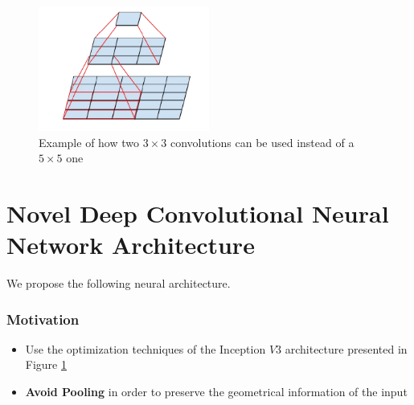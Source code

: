 \documentclass[a0, portrait]{IWIposter}
\begin{document}
\begin{multicols}{3}
\begin{itemize}
\end{itemize}

\begin{figure}[H]
	\centering
	\includegraphics[width=0.5\textwidth]{ConvolutionsExample.png}
	\caption{Example of how two $3 \times 3$ convolutions can be used instead of a $5 \times 5$ one}
	\label{fig:ConvolutionsExample}
\end{figure}



\section*{Novel Deep Convolutional Neural Network Architecture}

We propose the following neural architecture.

\centering
\subsubsection*{Motivation}
	\begin{itemize}
		\item Use the optimization techniques of the Inception $V3$ architecture presented in Figure \ref{fig:ConvolutionsExample}
		\item \textbf{Avoid Pooling} in order to preserve the geometrical information of the input

	\end{itemize}

\centering

\end{multicols}
\end{document}
